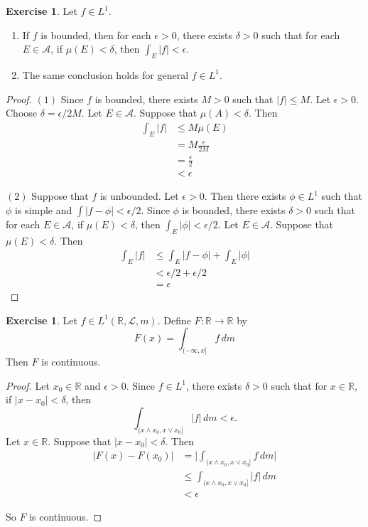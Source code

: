 \documentclass[12pt]{amsart}
\theoremstyle{definition}
\newtheorem{ex}[definition]{Exercise}
\newcommand{\del}{\delta}
\newcommand{\ep}{\epsilon}
\newcommand{\R}{\mathbb{R}}
\newcommand{\MA}{\mathcal{A}}
\newcommand{\ML}{\mathcal{L}}
\newcommand{\dm}{\, d m}
\newcommand{\lex}[1]{\label{ex:#1}}
\begin{document}
	\begin{ex} \lex{00000} 
		Let $f \in L^1$. 
		\begin{enumerate}
			\item If $f$ is bounded, then for each $\ep >0$, there exists $\del >0$ such that for each $E \in \MA$, if $\mu(E) < \del$, then $\int_E |f| < \ep $.
			\item The same conclusion holds for general $f \in L^1$.
		\end{enumerate} 
	\end{ex}
	
	\begin{proof}
		$(1)$ Since $f$ is bounded, there exists $M >0$ such that $|f| \leq M$. Let $\ep >0$. Choose $\del = \ep/2M$. Let $E \in \MA$. Suppose that $\mu(A) < \del$. Then 
		\begin{align*}
			\int_E|f| 
			& \leq M \mu(E)\\
			&= M\frac{\ep}{2M}\\
			&= \frac{\ep}{2}\\
			&< \ep
		\end{align*}
		
		$(2)$ Suppose that $f$ is unbounded. Let $\epsilon >0$. Then there exists $\phi \in L^1$ such that $\phi$ is simple and $\int|f-\phi| < \ep/2$. Since $\phi$ is bounded, there exists $\del >0 $ such that for each $E \in \MA$, if $\mu(E) < \del$, then $\int_E |\phi| < \ep/2$. Let $E \in \MA$. Suppose that $\mu(E) < \del$. Then 
		\begin{align*}
			\int_E|f|
			& \leq \int_E |f-\phi| + \int_E |\phi|\\
			& < \ep/2 + \ep/2\\
			& = \ep
		\end{align*}   
	\end{proof}
	
	\begin{ex} \lex{00000} 
		Let $f \in L^1(\R, \ML, m)$. Define $F: \R \rightarrow \R$ by $$F(x) = \int_{(-\infty,x]}f \dm$$
		Then $F$ is continuous.
	\end{ex}
	
	\begin{proof}
		Let $x_0 \in \R$ and $\epsilon >0$. Since $f \in L^1$, there exists $\del >0$ such that for $x \in \R$, if $|x-x_0| < \del$, then $$\int_{(x \wedge x_0,x \vee x_0]}|f| \dm < \ep.$$ Let $x \in \R$. Suppose that $|x-x_0|< \del$. Then 
		\begin{align*}
			|F(x)-F(x_0)|
			&= \bigg|\int_{(x \wedge x_0,x \vee x_0]}f \dm \bigg|\\
			& \leq \int_{(x \wedge x_0,x \vee x_0]}|f| \dm \\
			& < \ep
		\end{align*} 
		
		So $F$ is continuous.
		
	\end{proof}
	
\end{document}

